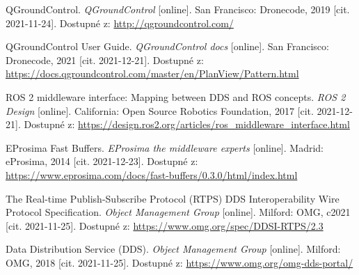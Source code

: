 \begin{thebibliography}{99}
QGroundControl. \textit{QGroundControl} [online]. San Francisco: Dronecode, 2019 [cit. 2021-11-24]. Dostupné z: \href{http://qgroundcontrol.com/}{http://qgroundcontrol.com/}

QGroundControl User Guide. \textit{QGroundControl docs} [online]. San Francisco: Dronecode, 2021 [cit. 2021-12-21]. Dostupné z: \href{https://docs.qgroundcontrol.com/master/en/PlanView/Pattern.html}{https://docs.qgroundcontrol.com/master/en/PlanView/Pattern.html}

ROS 2 middleware interface: Mapping between DDS and ROS concepts. \textit{ROS 2 Design} [online]. California: Open Source Robotics Foundation, 2017 [cit. 2021-12-21]. Dostupné z: \href{https://design.ros2.org/articles/ros\_middleware\_interface.html}{https://design.ros2.org/articles/ros\_middleware\_interface.html}




EProsima Fast Buffers. \textit{EProsima the middleware experts} [online]. Madrid: eProsima, 2014 [cit. 2021-12-23]. Dostupné z: \href{https://www.eprosima.com/docs/fast-buffers/0.3.0/html/index.html}{https://www.eprosima.com/docs/fast-buffers/0.3.0/html/index.html}

The Real-time Publish-Subscribe Protocol (RTPS) DDS Interoperability Wire Protocol Specification. \textit{Object Management Group} [online]. Milford: OMG, c2021 [cit. 2021-11-25]. Dostupné z: \href{https://www.omg.org/spec/DDSI-RTPS/2.3}{https://www.omg.org/spec/DDSI-RTPS/2.3}
	
Data Distribution Service (DDS). \textit{Object Management Group} [online]. Milford: OMG, 2018 [cit. 2021-11-25]. Dostupné z: \href{https://www.omg.org/omg-dds-portal/}{https://www.omg.org/omg-dds-portal/}


\end{thebibliography}
